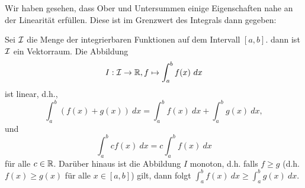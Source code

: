 Wir haben gesehen, dass Ober  und Untersummen einige Eigenschaften nahe an der Linearität erfüllen. Diese ist im Grenzwert des Integrals dann gegeben:
\label{integration/riemann:lemma-2}
\begin{lemma}{}{}



Sei \({\cal I}\) die Menge der integrierbaren Funktionen auf dem Intervall \([a,b]\). dann ist \({\cal I}\) ein Vektorraum. Die Abbildung
\begin{equation*}
I: {\cal I} \rightarrow \mathbb{R}, f \mapsto \int_a^b f(x)~dx
\end{equation*}
ist linear, d.h.,
\begin{equation*}
 \int_a^b (f(x)+g(x))~dx = \int_a^b f(x)~dx + \int_a^b g(x)~dx,
\end{equation*}
und
\begin{equation*}
 \int_a^b c f(x)~dx = c \int_a^b f(x)~dx
\end{equation*}
für alle \(c \in \mathbb{R}\). Darüber hinaus ist die Abbildung \(I\) monoton, d.h. falls \(f \geq g\) (d.h. \(f(x) \geq g(x)\) für alle \(x\in[a,b]\)) gilt, dann folgt \(\int_a^b f(x)~dx \geq \int_a^b g(x)~dx. \)
\end{lemma}

